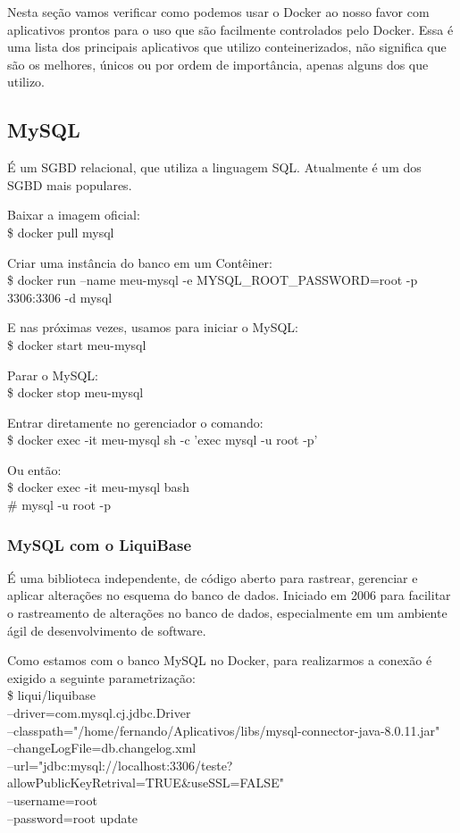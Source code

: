 \documentclass[a4paper,11pt]{article}
\begin{document}
Nesta seção vamos verificar como podemos usar o Docker ao nosso favor com aplicativos prontos para o uso que são facilmente controlados pelo Docker. Essa é uma lista dos principais aplicativos que utilizo conteinerizados, não significa que são os melhores, únicos ou por ordem de importância, apenas alguns dos que utilizo.

\subsection{MySQL}
É um SGBD relacional, que utiliza a linguagem SQL. Atualmente é um dos SGBD mais populares. 

Baixar a imagem oficial: \\
{\ttfamily\$ docker pull mysql}

Criar uma instância do banco em um Contêiner: \\
{\ttfamily\$ docker run --name meu-mysql -e MYSQL\_ROOT\_PASSWORD=root -p 3306:3306 -d mysql}

E nas próximas vezes, usamos para iniciar o MySQL: \\
{\ttfamily\$ docker start meu-mysql}

Parar o MySQL: \\
{\ttfamily\$ docker stop meu-mysql}

Entrar diretamente no gerenciador o comando: \\
{\ttfamily\$ docker exec -it meu-mysql sh -c 'exec mysql -u root -p'}

Ou então: \\
{\ttfamily\$ docker exec -it meu-mysql bash \\
\# mysql -u root -p}

\subsubsection{MySQL com o LiquiBase}
É uma biblioteca independente, de código aberto para rastrear, gerenciar e aplicar alterações no esquema do banco de dados. Iniciado em 2006 para facilitar o rastreamento de alterações no banco de dados, especialmente em um ambiente ágil de desenvolvimento de software. 

Como estamos com o banco MySQL no Docker, para realizarmos a conexão é exigido a seguinte parametrização: \\ 
{\ttfamily\$ liqui/liquibase \\
--driver=com.mysql.cj.jdbc.Driver \\ --classpath="/home/fernando/Aplicativos/libs/mysql-connector-java-8.0.11.jar" \\ 
--changeLogFile=db.changelog.xml \\ --url="jdbc:mysql://localhost:3306/teste?allowPublicKeyRetrival=TRUE\&useSSL=FALSE" \\ 
--username=root \\
--password=root update}
\end{document}

